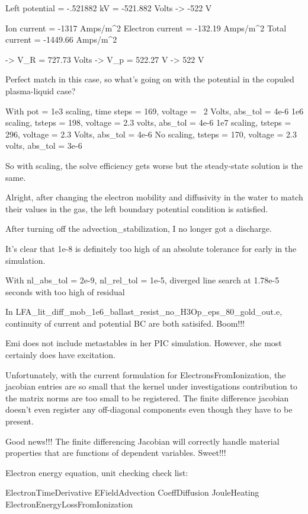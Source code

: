{Left potential = -.521882 kV = -521.882 Volts -> -522 V

Ion current = -1317 Amps/m^2
Electron current = -132.19 Amps/m^2
Total current = -1449.66 Amps/m^2

-> V_R = 727.73 Volts
-> V_p = 522.27 V -> 522 V

Perfect match in this case, so what's going on with the potential in the copuled plasma-liquid case?

With pot = 1e3 scaling, time steps = 169, voltage = ~2 Volts, abs_tol = 4e-6
1e6 scaling, tsteps = 198, voltage = 2.3 volts, abs_tol = 4e-6
1e7 scaling, tsteps = 296, voltage = 2.3 Volts, abs_tol = 4e-6
No scaling, tsteps = 170, voltage = 2.3 volts, abs_tol = 3e-6

So with scaling, the solve efficiency gets worse but the steady-state solution is the same.

Alright, after changing the electron mobility and diffusivity in the water to match their values in the gas, the left boundary potential condition is satisfied.

After turning off the advection_stabilization, I no longer got a discharge.

It's clear that 1e-8 is definitely too high of an absolute tolerance for early in the simulation.

With nl_abs_tol = 2e-9, nl_rel_tol = 1e-5, diverged line search at 1.78e-5 seconds with too high of residual

In LFA_lit_diff_mob_1e6_ballast_resist_no_H3Op_eps_80_gold_out.e, continuity of current and potential BC are both satisifed. Boom!!!

Emi does not include metastables in her PIC simulation. However, she most certainly does have excitation.

Unfortunately, with the current formulation for ElectronsFromIonization, the jacobian entries are so small that the kernel under investigations contribution to the matrix norms are too small to be registered. The finite difference jacobian doesn't even register any off-diagonal components even though they have to be present.

Good news!!! The finite differencing Jacobian will correctly handle material properties that are functions of dependent variables. Sweet!!!

Electron energy equation, unit checking check list:

ElectronTimeDerivative
EFieldAdvection
CoeffDiffusion
JouleHeating
ElectronEnergyLossFromIonization

}
